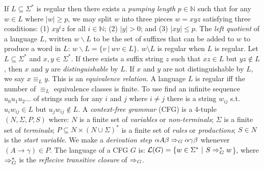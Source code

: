  If $L \subseteq \Sigma^*$ is regular then there exists a \textit{pumping length} $p \in \mathbb{N}$ such that for any $w \in L$ where $|w| \ge p$, we may split $w$ into three pieces $w = xyz$ satisfying three conditions: (1) $xy^iz$ for all $i \in \mathbb{N}$; (2) $|y| > 0$; and (3) $|xy| \le p$.
 The \textit{left quotient} of a language $L$, written $w \backslash L$ to be the set of suffixes that can be added to $w$ to produce a word in $L$: $w \backslash L = \{v\ |\ wv \in L\}$. $w\setminus L$ is regular when $L$ is regular.
 Let $L \subseteq \Sigma^*$ and $x,y \in \Sigma^*$. If there exists a suffix string $z$ such that $xz \in L$ but $yz \notin L$, then $x$ and $y$ are \textit{distinguishable} by $L$. If $x$ and $y$ are not distinguishable by $L$, we say $x \equiv_L y$. This is an \textit{equivalence relation}.
 A language $L$ is regular iff the number of $\equiv_L$ equivalence classes is finite. To use find an infinite sequence $u_0 u_1 u_2 \ldots$ of strings such for any $i$ and $j$ where $i \ne j$ there is a string $w_{ij}$ s.t. $u_i w_{ij} \in L$ but $u_j w_{ij} \notin L$.
 A \textit{context-free grammar} (CFG) is a 4-tuple $(N, \Sigma, P, S)$ where: $N$ is a finite set of \textit{variables} or \textit{non-terminals}; $\Sigma$ is a finite set of \textit{terminals}; $P \subseteq N \times (N \cup \Sigma)^*$ is a finite set of \textit{rules} or \textit{productions}; $S \in N$ is the \textit{start variable}.
 We make a \textit{derivation step} $\alpha A\beta \Rightarrow_{G} \alpha \gamma \beta$ whenever $(A \to \gamma) \in P$. The language of a CFG $G$ is: $\mathcal{L}(G) = \{w \in \Sigma^*\ |\ S \Rightarrow_{G}^* w$\}, where $\Rightarrow_{G}^*$ is the \textit{reflecive transitive closure} of $\Rightarrow_{G}$.